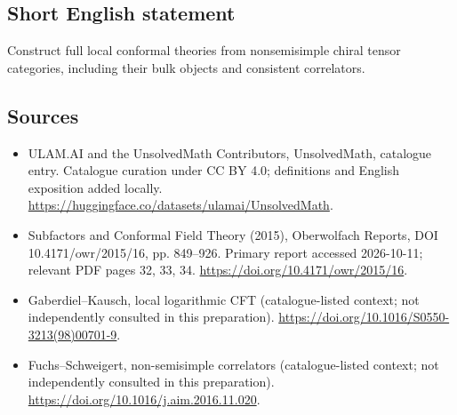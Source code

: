 \documentclass[11pt]{article}
\begin{document}
\subsection{Short English statement}
Construct full local conformal theories from nonsemisimple chiral tensor categories, including their bulk objects and consistent correlators.
\subsection{Sources}
\begin{itemize}
\item[\hypertarget{source:statement:1}{S1}] ULAM.AI and the UnsolvedMath Contributors, UnsolvedMath, catalogue entry. Catalogue curation under CC BY 4.0; definitions and English exposition added locally.
\url{https://huggingface.co/datasets/ulamai/UnsolvedMath}.
\item[\hypertarget{source:statement:2}{S2}] Subfactors and Conformal Field Theory (2015), Oberwolfach Reports, DOI 10.4171/owr/2015/16, pp. 849--926. Primary report accessed 2026-10-11; relevant PDF pages 32, 33, 34.
\url{https://doi.org/10.4171/owr/2015/16}.
\item[\hypertarget{source:statement:3}{S3}] Gaberdiel--Kausch, local logarithmic CFT (catalogue-listed context; not independently consulted in this preparation).
\url{https://doi.org/10.1016/S0550-3213(98)00701-9}.
\item[\hypertarget{source:statement:4}{S4}] Fuchs--Schweigert, non-semisimple correlators (catalogue-listed context; not independently consulted in this preparation).
\url{https://doi.org/10.1016/j.aim.2016.11.020}.
\end{itemize}
\label{end:statement}
\end{document}
